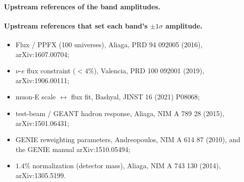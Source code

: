 \paragraph{Upstream references of the band amplitudes.}

\paragraph{Upstream references that set each band's $\pm1\sigma$ amplitude.}
\begin{itemize}[nosep]
  \item Flux / PPFX (100 universes), Aliaga, PRD 94 092005 (2016), arXiv:1607.00704;
  \item $\nu$-$e$ flux constraint ($<4\%$), Valencia, PRD 100 092001 (2019), arXiv:1906.00111;
  \item muon-E scale $\leftrightarrow$ flux fit, Bashyal, JINST 16 (2021) P08068;
  \item test-beam / GEANT hadron response, Aliaga, NIM A 789 28 (2015), arXiv:1501.06431;
  \item GENIE reweighting parameters, Andreopoulos, NIM A 614 87 (2010), and the GENIE manual arXiv:1510.05494;
  \item $1.4\%$ normalization (detector mass), Aliaga, NIM A 743 130 (2014), arXiv:1305.5199.
\end{itemize}

